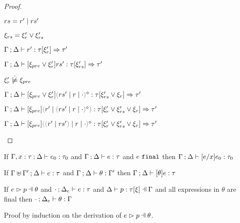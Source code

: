 \begin{proof}
\begin{byCases}
  \item[\text{(\ref{rule:CTRules})}]
    \begin{pfsteps*}
    \item $rs = r' \mid rs'$ 
    \item $\xi_{rs} = \xi_r' \vee \xi_{rs}'$ 
    \item $\Gamma \mathbin{;} \Delta \vdash r' : \tau [\xi_r'] \Rightarrow \tau'$  
    \item $\Gamma \mathbin{;} \Delta \vdash [\xi_{pre} \vee \xi_r'] rs' : \tau [\xi_{rs}'] \Rightarrow \tau'$  
    \item $\cnotsatisfy{\xi_r'}{\xi_{pre}}$  
    \item $\chrulstyp{\Gamma}{\Delta}{\cor{\xi_{pre}}{\xi_r'}}{\rmpointer{\zruls{rs'}{r}{\cdot}}}{\tau}{\cor{\xi_{rs}'}{\xi_r}}{\tau'}$  
    \item $\chrulstyp{\Gamma}{\Delta}{\xi_{pre}}{\hrulesP{r'}{\rmpointer{\zruls{rs'}{r}{\cdot}}}}{\tau}{\cor{\xi_r'}{\cor{\xi_{rs}'}{\xi_r}}}{\tau'}$  
    \item $\chrulstyp{\Gamma}{\Delta}{\xi_{pre}}{\rmpointer{\zruls{\hrulesP{r'}{rs'}}{r}{\cdot}}}{\tau}{\cor{\xi_r'}{\cor{\xi_{rs}'}{\xi_r}}}{\tau'}$ 
    \end{pfsteps*}
  \resetpfcounter
  \end{byCases}
\end{proof}

\begin{lemma}[Substitution]
  \label{lem:substitution}
  If $\Gamma, x : \tau \mathbin{;} \Delta \vdash e_0 : \tau_0$ and $\Gamma \mathbin{;} \Delta \vdash e : \tau$ and $e ~\mathtt{final}$
  then $\Gamma \mathbin{;} \Delta \vdash [e/x]e_0 : \tau_0$
\end{lemma}

\begin{lemma}
  \label{lem:simult-substitution}
  If $\Gamma \uplus \Gamma' \mathbin{;} \Delta \vdash e : \tau$ and $\Gamma \mathbin{;} \Delta \vdash \theta : \Gamma'$
  then $\Gamma \mathbin{;} \Delta \vdash [\theta]e : \tau$
\end{lemma}

\begin{lemma}
  \label{lem:subs-typing}
  If $\hpatmatch{e}{p}{\theta}$ and $\cdot \mathbin{;} \Delta_e \vdash e : \tau$ and $\chpattyp{p}{\tau}{\xi}{\Gamma}{\Delta}$ and all expressions in $\theta$ are final
  then $\cdot \mathbin{;} \Delta_e \vdash \theta : \Gamma$
\end{lemma}
Proof by induction on the derivation of $\hpatmatch{e}{p}{\theta}$.

